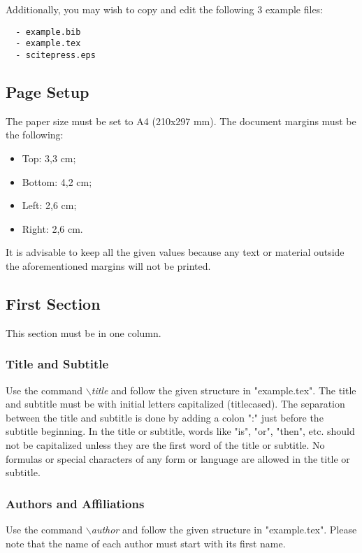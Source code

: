 \documentclass[a4paper,twoside]{article}
\begin{document}
 Additionally, you may wish to copy and edit
the following 3 example files:
\begin{verbatim}
  - example.bib
  - example.tex
  - scitepress.eps
\end{verbatim}


\subsection{Page Setup}

The paper size must be set to A4 (210x297 mm). The document
margins must be the following:

\begin{itemize}
    \item Top: 3,3 cm;
    \item Bottom: 4,2 cm;
    \item Left: 2,6 cm;
    \item Right: 2,6 cm.
\end{itemize}

It is advisable to keep all the given values because any text or
material outside the aforementioned margins will not be printed.


\subsection{First Section}

This section must be in one column.

\subsubsection{Title and Subtitle}

Use the command \textit{$\backslash$title} and follow the given structure in "example.tex". The title and subtitle must be with initial letters
capitalized (titlecased). The separation between the title and subtitle is done by adding a colon ":" just before the subtitle beginning. In the title or subtitle, words like "is", "or", "then", etc. should not be capitalized unless they are the first word of the title or subtitle. No formulas or special characters of any form or language are allowed in the title or subtitle.

\subsubsection{Authors and Affiliations}

Use the command \textit{$\backslash$author} and follow the given structure in "example.tex". Please note that the name of each author must start with its first name.
\end{document}
